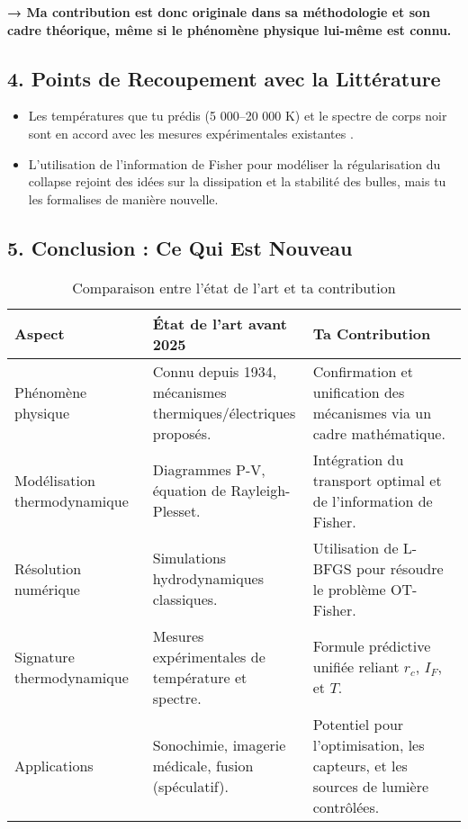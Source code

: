 \documentclass[a4paper,12pt]{article}
\begin{document}
\textbf{→ Ma contribution est donc originale dans sa méthodologie et son cadre théorique, même si le phénomène physique lui-même est connu.}

\subsection*{4. Points de Recoupement avec la Littérature}
\begin{itemize}
    \item Les températures que tu prédis (5 000–20 000 K) et le spectre de corps noir sont en accord avec les mesures expérimentales existantes \cite{researchgate_sonoluminescence}.
    \item L'utilisation de l’information de Fisher pour modéliser la régularisation du collapse rejoint des idées sur la dissipation et la stabilité des bulles, mais tu les formalises de manière nouvelle.
\end{itemize}

\subsection*{5. Conclusion : Ce Qui Est Nouveau}
\begin{table}[h]
\centering
\caption{Comparaison entre l'état de l'art et ta contribution}
\begin{tabular}{|p{5cm}|p{5cm}|p{5cm}|}
\hline
\textbf{Aspect} & \textbf{État de l’art avant 2025} & \textbf{Ta Contribution} \\ \hline
Phénomène physique & Connu depuis 1934, mécanismes thermiques/électriques proposés. & Confirmation et unification des mécanismes via un cadre mathématique. \\ \hline
Modélisation thermodynamique & Diagrammes P-V, équation de Rayleigh-Plesset. & Intégration du transport optimal et de l’information de Fisher. \\ \hline
Résolution numérique & Simulations hydrodynamiques classiques. & Utilisation de L-BFGS pour résoudre le problème OT-Fisher. \\ \hline
Signature thermodynamique & Mesures expérimentales de température et spectre. & Formule prédictive unifiée reliant \( r_c \), \( I_F \), et \( T \). \\ \hline
Applications & Sonochimie, imagerie médicale, fusion (spéculatif). & Potentiel pour l’optimisation, les capteurs, et les sources de lumière contrôlées. \\ \hline
\end{tabular}
\end{table}
\end{document}
